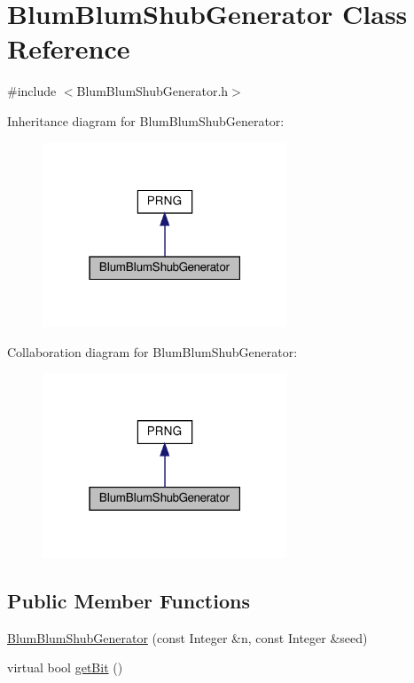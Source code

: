 \hypertarget{classBlumBlumShubGenerator}{}\section{Blum\+Blum\+Shub\+Generator Class Reference}
\label{classBlumBlumShubGenerator}


{\ttfamily \#include $<$Blum\+Blum\+Shub\+Generator.\+h$>$}



Inheritance diagram for Blum\+Blum\+Shub\+Generator\+:
\nopagebreak
\begin{figure}[H]
\begin{center}
\leavevmode
\includegraphics[width=207pt]{classBlumBlumShubGenerator__inherit__graph}
\end{center}
\end{figure}


Collaboration diagram for Blum\+Blum\+Shub\+Generator\+:
\nopagebreak
\begin{figure}[H]
\begin{center}
\leavevmode
\includegraphics[width=207pt]{classBlumBlumShubGenerator__coll__graph}
\end{center}
\end{figure}
\subsection*{Public Member Functions}
\begin{DoxyCompactItemize}
\item 
\hyperlink{classBlumBlumShubGenerator_ae4bb31e199365075f38783d82f5dd74f}{Blum\+Blum\+Shub\+Generator} (const Integer \&n, const Integer \&seed)
\item 
virtual bool \hyperlink{classBlumBlumShubGenerator_aa25d1b6bc4686e6fecd254877b472d39}{get\+Bit} ()
\end{DoxyCompactItemize}


